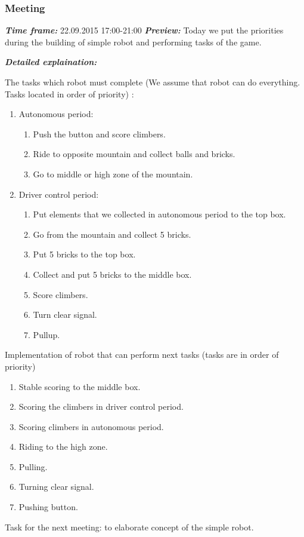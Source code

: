 \addtocounter{number_of_meeting}{1}
\subsubsection{ Meeting}
	\textit{\textbf{Time frame:}} 22.09.2015 17:00-21:00 \newline
	\textit{\textbf{Preview:}} Today we put the priorities during the building of simple robot and performing tasks of the game.\newline \newline
  
  \newline
  \textit{\textbf{Detailed explaination:}}
  \begin{enumerate*}
  	\item The tasks which robot must complete (We assume that robot can do everything. Tasks located in order of priority) :
  	\begin{enumerate}
  		\item Autonomous period:
  		\begin{enumerate}
  			\item Push the button and score climbers.
  			\item Ride to opposite mountain and collect balls and bricks.
  			\item Go to middle or high zone of the mountain.
  		\end{enumerate}
  		\item Driver control period:
  		\begin{enumerate}
	  		\item Put elements that we collected in autonomous period to the top box.
	  		\item Go from the mountain and collect 5 bricks.
	  		\item Put 5 bricks to the top box.
	  		\item Collect and put 5 bricks to the middle box.
	  		\item Score climbers.
	  		\item Turn clear signal.
	  		\item Pullup.
  		\end{enumerate}
  	\end{enumerate}
  	\item Implementation of robot that can perform next tasks (tasks are in order of priority)
  	\begin{enumerate}
  		\item Stable scoring to the middle box.
  		\item Scoring the climbers in driver control period.
  		\item Scoring climbers in autonomous period.
  		\item Riding to the high zone.
  		\item Pulling.
  		\item Turning clear signal.
  		\item Pushing button.
  	\end{enumerate}
	\newline
	
	Task for the next meeting: to elaborate concept of the simple robot.
  	
  \end{enumerate*}
  

  


\fillpage
